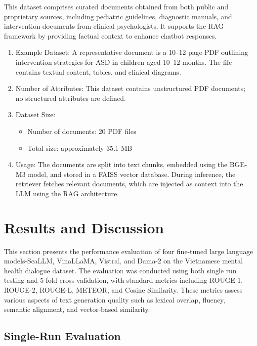 \documentclass[conference]{IEEEtran}
\begin{document}
This dataset comprises curated documents obtained from both public and proprietary sources, including pediatric guidelines, diagnostic manuals, and intervention documents from clinical psychologists. It supports the RAG framework by providing factual context to enhance chatbot responses.
\begin{enumerate}[label=(\alph*)]
\item Example Dataset: 
A representative document is a 10–12 page PDF outlining intervention strategies for ASD in children aged 10–12 months. The file contains textual content, tables, and clinical diagrams.

\item Number of Attributes: 
This dataset contains unstructured PDF documents; no structured attributes are defined.

\item Dataset Size: 
\begin{itemize}
    \item Number of documents: 20 PDF files
    \item Total size: approximately 35.1 MB
\end{itemize}

\item Usage: 
The documents are split into text chunks, embedded using the BGE-M3 model, and stored in a FAISS vector database. During inference, the retriever fetches relevant documents, which are injected as context into the LLM using the RAG architecture.
\end{enumerate}

\section{Results and Discussion}
\label{sec:results-discussion}

This section presents the performance evaluation of four fine-tuned large language models-SeaLLM, VinaLLaMA, Vistral, and Dama-2 on the Vietnamese mental health dialogue dataset. The evaluation was conducted using both single run testing and 5 fold cross validation, with standard metrics including ROUGE-1, ROUGE-2, ROUGE-L, METEOR, and Cosine Similarity. These metrics assess various aspects of text generation quality such as lexical overlap, fluency, semantic alignment, and vector-based similarity.

\subsection{Single-Run Evaluation}
\end{document}
